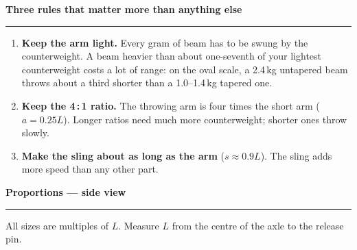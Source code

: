 \documentclass[11pt,a4paper]{article}
\newcommand{\sechead}[1]{%
  \par\vspace{6pt}%
  {\bfseries\large\color{HeadGrey} #1}\\[-4pt]
  {\color{RuleGrey}\rule{\linewidth}{0.8pt}}\par\vspace{1pt}
}
\begin{document}
\sechead{Three rules that matter more than anything else}
\begin{enumerate}[itemsep=2pt, leftmargin=1.6em, topsep=1pt]
  \item \textbf{Keep the arm light.} Every gram of beam has to be swung by the counterweight. A beam heavier than about one-seventh of your lightest counterweight costs a lot of range: on the oval scale, a 2.4\,kg untapered beam throws about a third shorter than a 1.0--1.4\,kg tapered one.
  \item \textbf{Keep the 4\,:\,1 ratio.} The throwing arm is four times the short arm ($a = 0.25L$). Longer ratios need much more counterweight; shorter ones throw slowly.
  \item \textbf{Make the sling about as long as the arm} ($s \approx 0.9L$). The sling adds more speed than any other part.
\end{enumerate}

\newpage
\sechead{Proportions --- side view}
All sizes are multiples of $L$. Measure $L$ from the centre of the axle to the release pin.
\end{document}

